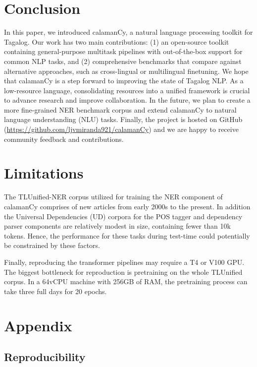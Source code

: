 \documentclass[11pt]{article}
\begin{document}
\section{Conclusion}

In this paper, we introduced calamanCy, a natural language processing toolkit for Tagalog.
Our work has two main contributions: (1) an open-source toolkit containing general-purpose multitask pipelines with out-of-the-box support for common NLP tasks, and
(2) comprehensive benchmarks that compare against alternative approaches, such as cross-lingual or multilingual finetuning. 
We hope that calamanCy is a step forward to improving the state of Tagalog NLP. 
As a low-resource language, consolidating resources into a unified framework is crucial to advance research and improve collaboration.
In the future, we plan to create a more fine-grained NER benchmark corpus and extend calamanCy to natural language understanding (NLU) tasks.
Finally, the project is hosted on GitHub (\url{https://github.com/ljvmiranda921/calamanCy}) and we are happy to receive community feedback and contributions.

\section*{Limitations}

The TLUnified-NER corpus utilized for training the NER component of calamanCy comprises of new articles from early 2000s to the present.
In addition the Universal Dependencies (UD) corpora for the POS tagger and dependency parser components are relatively modest in size, containing fewer than 10k tokens.
Hence, the performance for these tasks during test-time could potentially be constrained by these factors.

Finally, reproducing the transformer pipelines may require a T4 or V100 GPU. 
The biggest bottleneck for reproduction is pretraining on the whole TLUnified corpus.
In a 64vCPU machine with 256GB of RAM, the pretraining process can take three full days for 20 epochs.




\appendix

\section{Appendix}

\subsection{Reproducibility}
\end{document}
